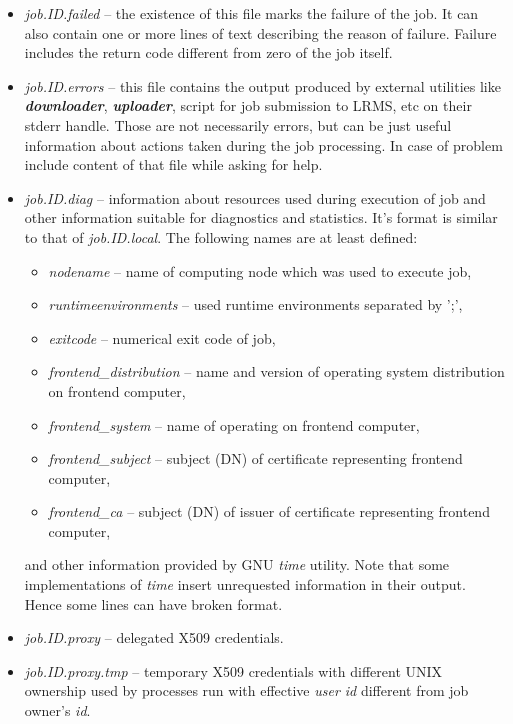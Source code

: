 \documentclass{article}                            %
\begin{document}
\begin{itemize}
\item \textit{job.ID.failed} -- the existence of this file marks the failure
of the job. It can also contain one or more lines of text describing
the reason of failure. Failure includes the return code different
from zero of the job itself.
\item \textit{job.ID.errors} -- this file contains the output produced by
external utilities like \textbf{\textit{downloader}}, \textbf{\textit{uploader}},
script for job submission to LRMS, etc on their stderr handle. Those
are not necessarily errors, but can be just useful information about
actions taken during the job processing. In case of problem include
content of that file while asking for help.
\item \textit{job.ID.diag} -- information about resources used during execution
of job and other information suitable for diagnostics and statistics.
It's format is similar to that of \textit{job.ID.local}. The following
names are at least defined:
\begin{itemize}
\item \textit{nodename} -- name of computing node which was used to execute
job,
\item \textit{runtimeenvironments} -- used runtime environments separated
by ';',
\item \textit{exitcode} -- numerical exit code of job,
\item \textit{frontend\_distribution} -- name and version of operating system
distribution on frontend computer,
\item \textit{frontend\_system} -- name of operating on frontend computer,
\item \textit{frontend\_subject} -- subject (DN) of certificate representing
frontend computer,
\item \textit{frontend\_ca} -- subject (DN) of issuer of certificate representing
frontend computer,
\end{itemize}
and other information provided by GNU \emph{time} utility. Note that
some implementations of \emph{time} insert unrequested information
in their output. Hence some lines can have broken format.
\item \textit{job.ID.proxy} -- delegated X509 credentials.
\item \textit{job.ID.proxy.tmp} -- temporary X509 credentials with different
UNIX ownership used by processes run with effective \emph{user id}
different from job owner's \emph{id}.
\end{itemize}
\end{document}
